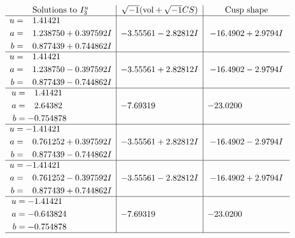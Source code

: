 \documentclass[1p]{elsarticle_modified}
\theoremstyle{definition}
\newcommand{\I}{\sqrt{-1}}
\begin{document}
$$\begin{array}{c|c|c}  
\text{Solutions to }I^u_{3}& \I (\text{vol} + \sqrt{-1}CS) & \text{Cusp shape}\\
 \hline 
\begin{aligned}
u &= \phantom{-}1.41421\phantom{ +0.000000I} \\
a &= \phantom{-}1.238750 + 0.397592 I \\
b &= \phantom{-}0.877439 + 0.744862 I\end{aligned}
 & -3.55561 - 2.82812 I & -16.4902 + 2.9794 I \\ \hline\begin{aligned}
u &= \phantom{-}1.41421\phantom{ +0.000000I} \\
a &= \phantom{-}1.238750 - 0.397592 I \\
b &= \phantom{-}0.877439 - 0.744862 I\end{aligned}
 & -3.55561 + 2.82812 I & -16.4902 - 2.9794 I \\ \hline\begin{aligned}
u &= \phantom{-}1.41421\phantom{ +0.000000I} \\
a &= \phantom{-}2.64382\phantom{ +0.000000I} \\
b &= -0.754878\phantom{ +0.000000I}\end{aligned}
 & -7.69319\phantom{ +0.000000I} & -23.0200\phantom{ +0.000000I} \\ \hline\begin{aligned}
u &= -1.41421\phantom{ +0.000000I} \\
a &= \phantom{-}0.761252 + 0.397592 I \\
b &= \phantom{-}0.877439 - 0.744862 I\end{aligned}
 & -3.55561 + 2.82812 I & -16.4902 - 2.9794 I \\ \hline\begin{aligned}
u &= -1.41421\phantom{ +0.000000I} \\
a &= \phantom{-}0.761252 - 0.397592 I \\
b &= \phantom{-}0.877439 + 0.744862 I\end{aligned}
 & -3.55561 - 2.82812 I & -16.4902 + 2.9794 I \\ \hline\begin{aligned}
u &= -1.41421\phantom{ +0.000000I} \\
a &= -0.643824\phantom{ +0.000000I} \\
b &= -0.754878\phantom{ +0.000000I}\end{aligned}
 & -7.69319\phantom{ +0.000000I} & -23.0200\phantom{ +0.000000I}\\
 \hline 
 \end{array}$$\newpage\newpage\renewcommand{\arraystretch}{1}
\end{document}
